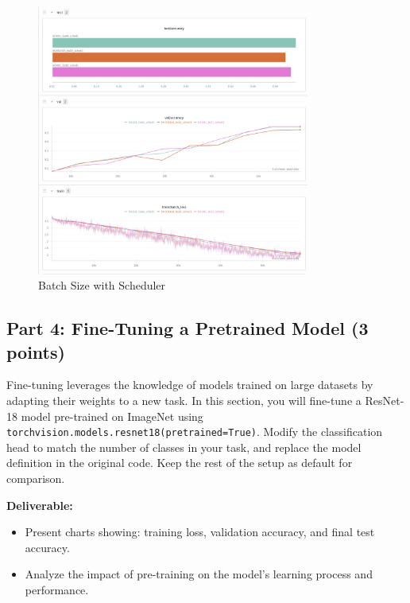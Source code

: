 \documentclass[11pt, oneside]{article}   	%
\begin{document}
\begin{answerbox}
\begin{figure}[h]
    \centering
    \includegraphics[width=0.8\textwidth]{images/batch_size_scheduler.png}
    \caption{Batch Size with Scheduler}
\end{figure}

\end{answerbox}

\subsection*{Part 4: Fine-Tuning a Pretrained Model (3 points)}
Fine-tuning leverages the knowledge of models trained on large datasets by adapting their weights to a new task. In this section, you will fine-tune a ResNet-18 model pre-trained on ImageNet using \texttt{torchvision.models.resnet18(pretrained=True)}. Modify the classification head to match the number of classes in your task, and replace the model definition in the original code. Keep the rest of the setup as default for comparison.


\noindent\textbf{Deliverable:}
\begin{itemize}
    \item Present charts showing: training loss, validation accuracy, and final test accuracy.
    \item Analyze the impact of pre-training on the model's learning process and performance.
    
\end{itemize}
\end{document}
